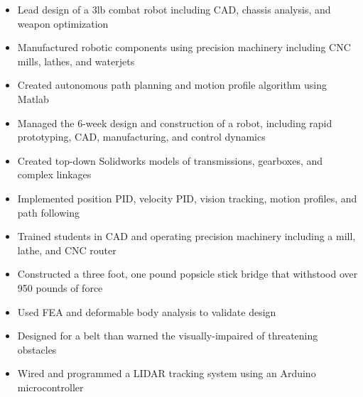 \documentclass{resume}
\begin{document}
\begin{itemize}
  \item Lead design of a 3lb combat robot including CAD, chassis analysis, and weapon optimization
  \item Manufactured robotic components using precision machinery including CNC mills, lathes, and waterjets
  \item Created autonomous path planning and motion profile algorithm using Matlab
\end{itemize}

\begin{itemize}
  \item Managed the 6-week design and construction of a robot, including rapid prototyping, CAD, manufacturing, and control dynamics
  \item Created top-down Solidworks models of transmissions, gearboxes, and complex linkages
  \item Implemented position PID, velocity PID, vision tracking, motion profiles, and path following
  \item Trained students in CAD and operating precision machinery including a mill, lathe, and CNC router
\end{itemize}

\begin{itemize}
  \item Constructed a three foot, one pound popsicle stick bridge that withstood over 950 pounds of force
  \item Used FEA and deformable body analysis to validate design
\end{itemize}


\begin{itemize}
  \item Designed for a belt than warned the visually-impaired of threatening obstacles
  \item Wired and programmed a LIDAR tracking system using an Arduino microcontroller
\end{itemize}
\end{document}
